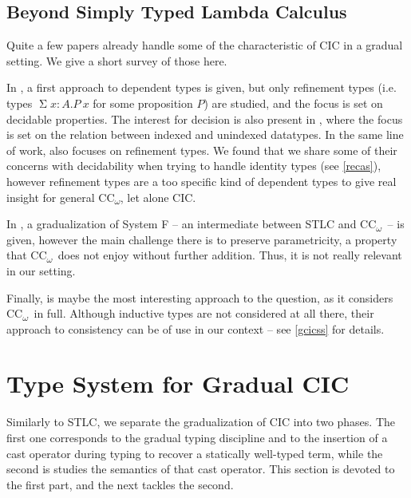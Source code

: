 \documentclass[en]{myarticle}
\renewcommand{\S}{\operatorname{\Sigma}}
\DeclareMathOperator{\?}{?}
\newcommand{\coc}{CC\textsubscript{$\omega$}}
\begin{document}
{\subsection{Beyond Simply Typed Lambda Calculus}
\label{interm}

Quite a few papers already handle some of the characteristic of CIC in a gradual setting. We give a short survey of those here.

In \cite{Tanter2015}, a first approach to dependent types is given, but only refinement types (i.e. types $\S x : A. P~x$ for some proposition $P$) are studied, and the focus is set on decidable properties. The interest for decision is also present in \cite{Dagand2018}, where the focus is set on the relation between indexed and unindexed datatypes. In the same line of work, \cite{Lehmann2017} also focuses on refinement types. We found that we share some of their concerns with decidability when trying to handle identity types (see \autoref{recas}), however refinement types are a too specific kind of dependent types to give real insight for general \coc, let alone CIC.

In \cite{Toro2019}, a gradualization of System F – an intermediate between STLC and \coc\ – is given, however the main challenge there is to preserve parametricity, a property that \coc\ does not enjoy without further addition. Thus, it is not really relevant in our setting.

Finally, \cite{Eremondi2019} is maybe the most interesting approach to the question, as it considers \coc\ in full. Although inductive types are not considered at all there, their approach to consistency can be of use in our context – see \autoref{gcicss} for details.


\section{Type System for Gradual CIC}
\label{gcic}

Similarly to STLC, we separate the gradualization of CIC into two phases. The first one corresponds to the gradual typing discipline and to the insertion of a cast operator during typing to recover a statically well-typed term, while the second is studies the semantics of that cast operator. This section is devoted to the first part, and the next tackles the second.

}
\end{document}
